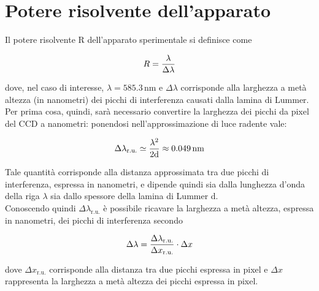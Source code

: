 \documentclass[twocolumn,10pt]{asme2ej}
\begin{document}
\section{Potere risolvente dell'apparato}\label{s:risolvente}

Il potere risolvente R dell'apparato sperimentale si definisce come

\vspace{-15pt}
\begin{equation}
    R = \frac{\lambda}{\Delta\lambda}
    \label{e:r}
\vspace{-5pt}
\end{equation}

dove, nel caso di interesse, $\lambda = 585.3 \,\si{\nano\metre}$ e $\Delta\lambda$ corrisponde alla larghezza a metà
altezza (in nanometri) dei picchi di interferenza causati dalla lamina di Lummer. Per prima cosa, quindi, sarà
necessario convertire la larghezza dei picchi da pixel del CCD a nanometri: ponendosi nell'approssimazione di luce
radente vale:

\vspace{-10pt}
\begin{equation}
    \Delta\lambda_{\text{r.u.}} \simeq \frac{\lambda^2}{2\text{d}} \approx 0.049\,\si{\nano\metre}
    \label{e:dlambdaru}
\vspace{-5pt}
\end{equation}

Tale quantità corrisponde alla distanza approssimata tra due picchi di interferenza, espressa in nanometri, e dipende
quindi sia dalla lunghezza d'onda della riga $\lambda$ sia dallo spessore della lamina di Lummer d.\\
Conoscendo quindi $\Delta\lambda_{\text{r.u.}}$ è possibile ricavare la larghezza a metà altezza, espressa in nanometri,
dei picchi di interferenza secondo

\vspace{-15pt}
\begin{equation}
    \Delta\lambda = \frac{\Delta\lambda_{\text{r.u.}}}{\Delta x_{\text{r.u.}}} \cdot \Delta x
    \label{e:dlambda}
\vspace{-5pt}
\end{equation}

dove $\Delta x_{\text{r.u.}}$ corrisponde alla distanza tra due picchi espressa in pixel e $\Delta x$ rappresenta la
larghezza a metà altezza dei picchi espressa in pixel.  \\
\end{document}
